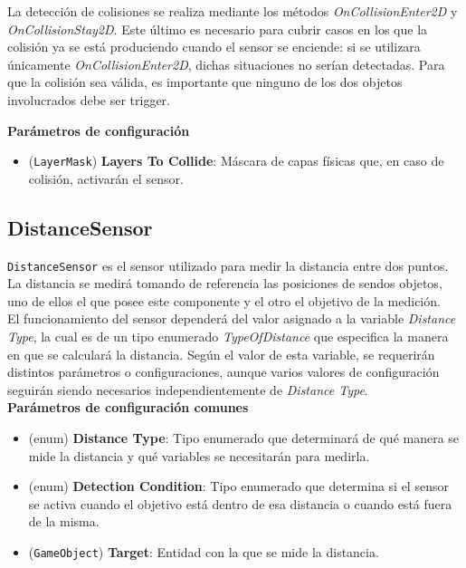 La detección de colisiones se realiza mediante los métodos \textit{OnCollisionEnter2D} y \textit{OnCollisionStay2D}. Este último es necesario para cubrir casos en los que la colisión ya se está produciendo cuando el sensor se enciende: si se utilizara únicamente \textit{OnCollisionEnter2D}, dichas situaciones no serían detectadas. Para que la colisión sea válida, es importante que ninguno de los dos objetos involucrados debe ser trigger.


\textbf{Parámetros de configuración}
\begin{itemize}
	\item (\texttt{LayerMask}) \textbf{Layers To Collide}: Máscara de capas físicas que, en caso de colisión, activarán el sensor.
\end{itemize}


\subsection{DistanceSensor}

\texttt{DistanceSensor} es el sensor utilizado para medir la distancia entre dos puntos. La distancia se medirá tomando de referencia las posiciones de sendos objetos, uno de ellos el que posee este componente y el otro el objetivo de la medición.\\

El funcionamiento del sensor dependerá del valor asignado a la variable \textit{Distance Type}, la cual es de un tipo enumerado \textit{TypeOfDistance} que especifica la manera en que se calculará la distancia. Según el valor de esta variable, se requerirán distintos parámetros o configuraciones, aunque varios valores de configuración seguirán siendo necesarios independientemente de \textit{Distance Type}.\\

\textbf{Parámetros de configuración comunes}
\begin{itemize}
	\item (enum) \textbf{Distance Type}: Tipo enumerado que determinará de qué manera se mide la distancia y qué variables se necesitarán para medirla.
	\item (enum) \textbf{Detection Condition}: Tipo enumerado que determina si el sensor se activa cuando el objetivo está dentro de esa distancia o cuando está fuera de la misma.
	\item (\texttt{GameObject})\textbf{ Target}: Entidad con la que se mide la distancia.
\end{itemize}

